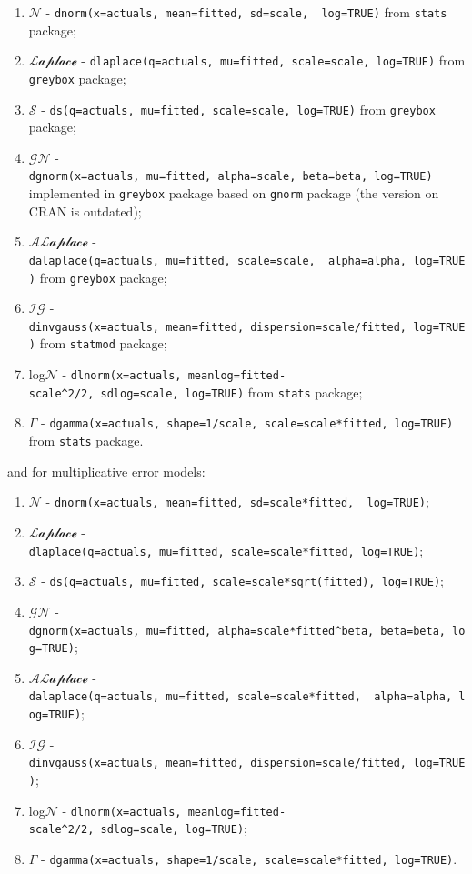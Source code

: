 \documentclass[
]{book}
\providecommand{\tightlist}{%
  \setlength{\itemsep}{0pt}\setlength{\parskip}{0pt}}
\theoremstyle{definition}
\theoremstyle{definition}
\theoremstyle{definition}
\theoremstyle{definition}
\theoremstyle{remark}
\begin{document}
\begin{enumerate}
\def\labelenumi{\arabic{enumi}.}
\tightlist
\item
  \(\mathcal{N}\) - \texttt{dnorm(x=actuals,\ mean=fitted,\ sd=scale,\ \ log=TRUE)} from \texttt{stats} package;
\item
  \(\mathcal{Laplace}\) - \texttt{dlaplace(q=actuals,\ mu=fitted,\ scale=scale,\ log=TRUE)} from \texttt{greybox} package;
\item
  \(\mathcal{S}\) - \texttt{ds(q=actuals,\ mu=fitted,\ scale=scale,\ log=TRUE)} from \texttt{greybox} package;
\item
  \(\mathcal{GN}\) - \texttt{dgnorm(x=actuals,\ mu=fitted,\ alpha=scale,\ beta=beta,\ log=TRUE)} implemented in \texttt{greybox} package based on \texttt{gnorm} package (the version on CRAN is outdated);
\item
  \(\mathcal{ALaplace}\) - \texttt{dalaplace(q=actuals,\ mu=fitted,\ scale=scale,\ \ alpha=alpha,\ log=TRUE)} from \texttt{greybox} package;
\item
  \(\mathcal{IG}\) - \texttt{dinvgauss(x=actuals,\ mean=fitted,\ dispersion=scale/fitted,\ log=TRUE)} from \texttt{statmod} package;
\item
  log\(\mathcal{N}\) - \texttt{dlnorm(x=actuals,\ meanlog=fitted-scale\^{}2/2,\ sdlog=scale,\ log=TRUE)} from \texttt{stats} package;
\item
  \(\mathcal{\Gamma}\) - \texttt{dgamma(x=actuals,\ shape=1/scale,\ scale=scale*fitted,\ log=TRUE)} from \texttt{stats} package.
\end{enumerate}

and for multiplicative error models:

\begin{enumerate}
\def\labelenumi{\arabic{enumi}.}
\tightlist
\item
  \(\mathcal{N}\) - \texttt{dnorm(x=actuals,\ mean=fitted,\ sd=scale*fitted,\ \ log=TRUE)};
\item
  \(\mathcal{Laplace}\) - \texttt{dlaplace(q=actuals,\ mu=fitted,\ scale=scale*fitted,\ log=TRUE)};
\item
  \(\mathcal{S}\) - \texttt{ds(q=actuals,\ mu=fitted,\ scale=scale*sqrt(fitted),\ log=TRUE)};
\item
  \(\mathcal{GN}\) - \texttt{dgnorm(x=actuals,\ mu=fitted,\ alpha=scale*fitted\^{}beta,\ beta=beta,\ log=TRUE)};
\item
  \(\mathcal{ALaplace}\) - \texttt{dalaplace(q=actuals,\ mu=fitted,\ scale=scale*fitted,\ \ alpha=alpha,\ log=TRUE)};
\item
  \(\mathcal{IG}\) - \texttt{dinvgauss(x=actuals,\ mean=fitted,\ dispersion=scale/fitted,\ log=TRUE)};
\item
  log\(\mathcal{N}\) - \texttt{dlnorm(x=actuals,\ meanlog=fitted-scale\^{}2/2,\ sdlog=scale,\ log=TRUE)};
\item
  \(\mathcal{\Gamma}\) - \texttt{dgamma(x=actuals,\ shape=1/scale,\ scale=scale*fitted,\ log=TRUE)}.
\end{enumerate}
\end{document}
